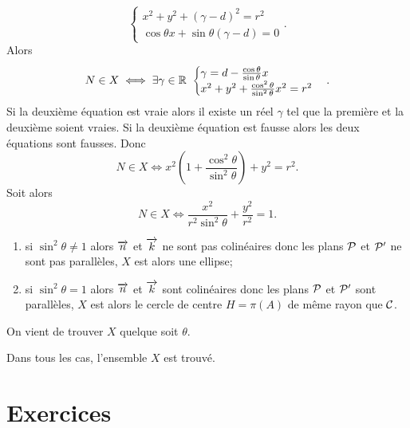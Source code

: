 \begin{enumerate}
\begin{equation}
\begin{cases}
        x^2 + y^2 + (\gamma - d)^2 = r^2\\
        \cos\theta x + \sin\theta (\gamma - d) = 0
      \end{cases}.
    \end{equation}
    Alors
    \begin{equation}
      N \in X \iff \exists \gamma \in \R \ 
      \begin{cases} 
        \gamma = d - \frac{\cos\theta}{\sin\theta}x \\ 
        x^2 + y^2 + \frac{\cos^2\theta}{\sin^2\theta}x^2 = r^2
      \end{cases}.
    \end{equation}
    Si la deuxième équation est vraie alors il existe un réel \(\gamma\) tel 
    que la première et la deuxième soient vraies. Si la deuxième équation 
    est fausse alors les deux équations sont fausses. Donc
    \begin{equation}
      N \in X \iff x^2\left(1 + \frac{\cos^2\theta}{\sin^2\theta}\right) + 
      y^2 = r^2.
    \end{equation}
    Soit alors 
    \begin{equation}
      N \in X \iff \frac{x^2}{r^2\sin^2\theta} + \frac{y^2}{r^2} = 1.
    \end{equation}
    \begin{enumerate}
      \item si \(\sin^2\theta\neq 1\) alors \(\vn\) et \(\vk\) ne sont pas 
        colinéaires donc les plans \(\P\) et \(\P'\) ne sont pas parallèles, 
        \(X\) est alors une ellipse;
      \item si \(\sin^2\theta = 1\) alors \(\vn\) et \(\vk\) sont 
        colinéaires donc les plans \(\P\) et \(\P'\) sont parallèles, \(X\) 
        est alors le cercle de centre \(H = \pi(A)\) de même rayon que 
        \(\courbe\).
    \end{enumerate}
    On vient de trouver \(X\) quelque soit \(\theta\).
\end{enumerate}
Dans tous les cas, l'ensemble \(X\) est trouvé.

\clearpage

\section{Exercices}

